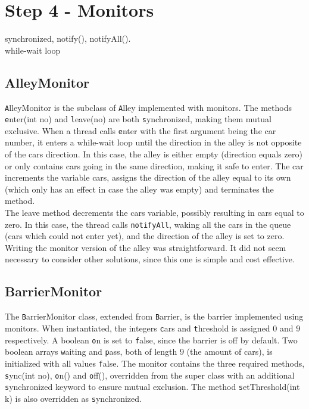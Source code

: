 \section*{Step 4 - Monitors}
synchronized, notify(), notifyAll().\\
while-wait loop
\subsection{AlleyMonitor}
{\texttt AlleyMonitor} is the subclass of {\texttt Alley} implemented with monitors. The methods {\texttt enter(int no)} and {\texttt leave(no)} are both {\texttt synchronized}, making them mutual exclusive. When a thread calls {\texttt enter} with the first argument being the car number, it enters a while-wait loop until the direction in the alley is not opposite of the cars direction. In this case, the alley is either empty (direction equals zero) or only contains cars going in the same direction, making it safe to enter. The car increments the variable cars, assigns the direction of the alley equal to its own (which only has an effect in case the alley was empty) and terminates the method.\\

The leave method decrements the cars variable, possibly resulting in cars equal to zero. In this case, the thread calls {\tt notifyAll}, waking all the cars in the queue (cars which could not enter yet), and the direction of the alley is set to zero.\\

Writing the monitor version of the alley was straightforward. It did not seem necessary to consider other solutions, since this one is simple and cost effective.

\subsection*{BarrierMonitor}
The {\texttt BarrierMonitor} class, extended from {\texttt Barrier}, is the barrier implemented using monitors. When instantiated, the integers {\texttt cars} and {\texttt threshold} is assigned $0$ and $9$ respectively. A boolean {\texttt on} is set to {\texttt false}, since the barrier is off by default. Two boolean arrays {\texttt waiting} and {\texttt pass}, both of length $9$ (the amount of cars), is initialized with all values {\texttt false}. The monitor contains the three required methods, {\texttt sync(int no)}, {\texttt on()} and {\texttt off()}, overridden from the super class with an additional {\texttt synchronized} keyword to ensure mutual exclusion. The method {\texttt setThreshold(int k)} is also overridden as {\texttt synchronized}.\\

